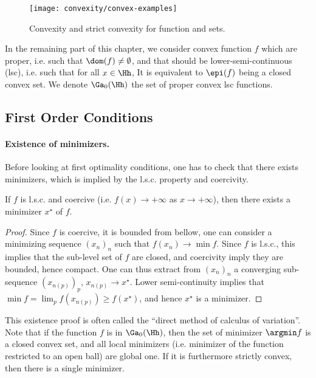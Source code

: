 \begin{figure}
\centering
\texttt{[image: convexity/convex-examples]}
\caption{\label{fig-convex-examples}
Convexity and strict convexity for function and sets.}
\end{figure}




In the remaining part of this chapter, we consider convex function $f$ which are proper, i.e. such that $\dom(f) \neq \emptyset$, and that should be lower-semi-continuous (lsc), i.e. such that for all $x \in \Hh$, 
It is equivalent to $\epi(f)$ being a closed convex set.
%
We denote $\Ga_0(\Hh)$ the set of proper convex lsc functions.

\subsection{First Order Conditions}

\paragraph{Existence of minimizers.}

Before looking at first optimality conditions, one has to check that there exists minimizers, which is implied by the l.s.c. property and coercivity.

\begin{prop}
	If $f$ is l.s.c. and coercive (i.e. $f(x)\rightarrow +\infty$ as $x \rightarrow +\infty$), then there exists a minimizer $x^\star$ of $f$. 
\end{prop}

\begin{proof}
Since $f$ is coercive, it is bounded from bellow, one can consider a minimizing sequence $(x_n)_n$ such that $f(x_n) \rightarrow \min f$. 
%
Since $f$ is l.s.c., this implies that the sub-level set of $f$ are closed, and coercivity imply they are bounded, hence compact. One can thus extract from $(x_n)_n$ a converging sub-sequence $(x_{n(p)})_p$, $x_{n(p)} \rightarrow x^\star$. Lower semi-continuity implies that $\min f = \lim_p f(x_{n(p)}) \geq f(x^\star)$, and hence $x^\star$ is a minimizer.
\end{proof}

This existence proof is often called the ``direct method of calculus of variation''.
%
Note that if the function $f$ is in $\Ga_0(\Hh)$, then the set of minimizer $\argmin f$ is a closed convex set, and all local minimizers (i.e. minimizer of the function restricted to an open ball) are global one. If it is furthermore strictly convex, then there is a single minimizer. 

